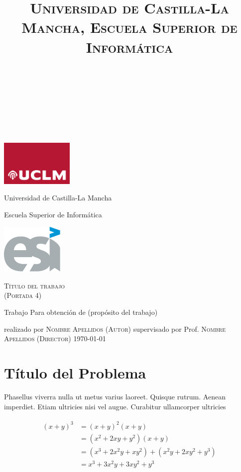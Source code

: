 \documentclass[paper=a4,fontsize=11pt]{scrartcl}
\title{	
\normalfont \normalsize 
\textsc{Universidad de Castilla-La Mancha, Escuela Superior de Informática} \\ [25pt]
\horrule{0.5pt} \\[0.4cm] %
\huge <Título de la Tarea> \\
\horrule{2pt} \\[0.5cm] %
}
\numberwithin{equation}{section} %
\numberwithin{figure}{section}
\numberwithin{table}{section}
\begin{document}
\begin{titlepage}
    \centering %
	\includegraphics[width=3.5cm]{uclm_logo}
	\hfill
	\parbox{.5\linewidth}{%
		\centering
		{\LARGE Universidad de Castilla-La Mancha\par}
		\vspace{.05\textheight}
		{\large Escuela Superior de Informática\par}
	}
	\hfill
	\includegraphics[width=3cm]{esi_logo}
	\par
    \par\vspace{.15\textheight}
    {\huge\textsc{Título del trabajo \\
     (Portada 4)}\par}
    \Large
    \par\vspace{.1\textheight}
    Trabajo
    \medbreak
    Para obtención de
    (propósito del trabajo)
    \par\vspace{.08\textheight}
    realizado por
    \medbreak
    \textsc{Nombre Apellidos (Autor)}
    \bigbreak
    supervisado por
    \medbreak
    Prof. \textsc{Nombre Apellidos (Director)}
    \vfill
    \noindent%
    \small \hfill \today %
\end{titlepage}


\section{Título del Problema}

Phasellus viverra nulla ut metus varius laoreet. Quisque rutrum. Aenean imperdiet. Etiam ultricies nisi vel augue. Curabitur ullamcorper ultricies

\begin{align} 
\begin{split}
(x+y)^3 	&= (x+y)^2(x+y)\\
&=(x^2+2xy+y^2)(x+y)\\
&=(x^3+2x^2y+xy^2) + (x^2y+2xy^2+y^3)\\
&=x^3+3x^2y+3xy^2+y^3
\end{split}					
\end{align}
\end{document}
